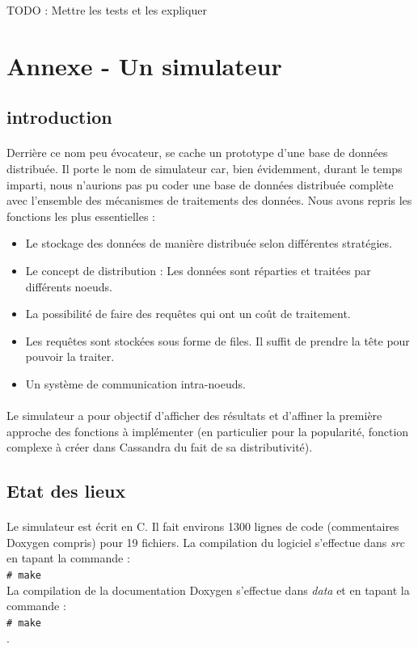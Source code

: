\documentclass[12pt]{article}
\newcommand{\shellcmd}[1]{\\\indent\indent\texttt{\footnotesize\# #1}\\}
\begin{document}
TODO : Mettre les tests et les expliquer

\section{Annexe - Un simulateur}

\subsection{introduction}

\paragraph{}Derrière ce nom peu évocateur, se cache un prototype d'une base de données distribuée. Il porte le nom de simulateur car, bien évidemment, durant le temps imparti, nous n'aurions pas pu coder une base de données distribuée complète avec l'ensemble des mécanismes de traitements des données. Nous avons repris les fonctions les plus essentielles :

\begin{itemize}
    \item Le stockage des données de manière distribuée selon différentes stratégies.
    \item Le concept de distribution : Les données sont réparties et traitées par différents noeuds.
    \item La possibilité de faire des requêtes qui ont un coût de traitement.
    \item Les requêtes sont stockées sous forme de files. Il suffit de prendre la tête pour pouvoir la traiter.
    \item Un système de communication intra-noeuds.
\end{itemize}

\paragraph{}Le simulateur a pour objectif d'afficher des résultats et d'affiner la première approche des fonctions à implémenter (en particulier pour la popularité, fonction complexe à créer dans Cassandra du fait de sa distributivité).

\subsection{Etat des lieux}

\paragraph{} Le simulateur est écrit en C. Il fait environs 1300 lignes de code (commentaires Doxygen compris) pour 19 fichiers. La compilation du logiciel s'effectue dans \textit{src} en tapant la commande  : \shellcmd{make}
La compilation de la documentation Doxygen s'effectue dans \textit{data} et en tapant la commande : \shellcmd{make}.
\end{document}
